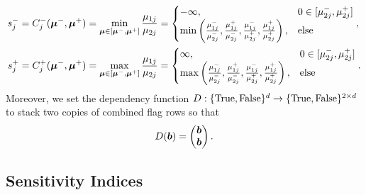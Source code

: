 \documentclass{article}[12pt]
\begin{document}
\begin{align*}
    s_j^- = C_j^-(\boldsymbol{\mu}^-,\boldsymbol{\mu}^+) &= \min_{\boldsymbol{\mu} \in [\boldsymbol{\mu}^-,\boldsymbol{\mu}^+]} \frac{\mu_{1j}}{\mu_{2j}} = 
    \begin{cases}
        -\infty, & 0 \in [\mu_{2j}^-,\mu_{2j}^+] \\
        \min\left(\frac{\mu_{1j}^-}{\mu_{2j}^-},\frac{\mu_{1j}^+}{\mu_{2j}^-},\frac{\mu_{1j}^-}{\mu_{2j}^+},\frac{\mu_{1j}^+}{\mu_{2j}^+}\right), & \text{else}
    \end{cases}, \\
    s_j^+ = C_j^+(\boldsymbol{\mu}^-,\boldsymbol{\mu}^+) &= \max_{\boldsymbol{\mu} \in [\boldsymbol{\mu}^-,\boldsymbol{\mu}^+]} \frac{\mu_{1j}}{\mu_{2j}} =
    \begin{cases}
        \infty, & 0 \in [\mu_{2j}^-,\mu_{2j}^+] \\
         \max\left(\frac{\mu_{1j}^-}{\mu_{2j}^-},\frac{\mu_{1j}^+}{\mu_{2j}^-},\frac{\mu_{1j}^-}{\mu_{2j}^+},\frac{\mu_{1j}^+}{\mu_{2j}^+}\right), & \text{else}
    \end{cases}.
\end{align*}
Moreover, we set the dependency function $D: \{\text{True},\text{False}\}^d \to \{\text{True},\text{False}\}^{2 \times d}$ to stack two copies of combined flag rows so that 
\begin{equation*}
    D(\boldsymbol{b}) =  \begin{pmatrix} \boldsymbol{b} \\ \boldsymbol{b} \end{pmatrix}.
\end{equation*}


\subsection{Sensitivity Indices}
\end{document}
